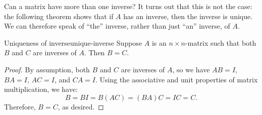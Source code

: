 Can a matrix have more than one inverse? It turns out that this is not
the case: the following theorem shows that if $A$ has an inverse, then
the inverse is unique. We can therefore speak of ``the'' inverse,
rather than just ``an'' inverse, of $A$.

\begin{theorem}{Uniqueness of inverse}{unique-inverse}
  Suppose $A$ is an $n\times n$-matrix such that both $B$ and $C$ are
  inverses of $A$. Then $B=C$.
\end{theorem}

\begin{proof}
  By assumption, both $B$ and $C$ are inverses of $A$, so we have
  $AB=I$, $BA=I$, $AC=I$, and $CA=I$. Using the associative and unit
  properties of matrix multiplication, we have:
  \begin{equation*}
    B = BI = B(AC) = (BA)C = IC = C.
  \end{equation*}
  Therefore, $B=C$, as desired.
\end{proof}
